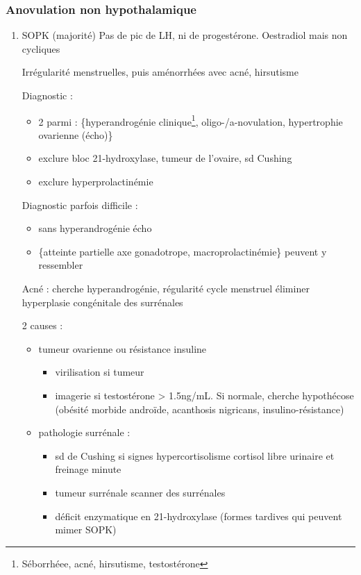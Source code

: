 \documentclass[11pt]{article}
\begin{document}
\subsubsection{Anovulation non hypothalamique}
\label{sec:org2eda7ab}
\begin{enumerate}
\item SOPK (majorité)
\label{sec:orgff34c23}
Pas de pic de LH, ni de progestérone. Oestradiol mais non cycliques

Irrégularité menstruelles, puis aménorrhées avec acné, hirsutisme

Diagnostic :
\begin{itemize}
\item 2 parmi : \{hyperandrogénie clinique\footnote{Séborrhéee, acné, hirsutisme, \inc testostérone}, oligo-/a-novulation, hypertrophie
ovarienne (écho)\}
\item exclure bloc 21-hydroxylase, tumeur de l'ovaire, sd Cushing
\item exclure hyperprolactinémie
\end{itemize}

Diagnostic parfois difficile :
\begin{itemize}
\item sans hyperandrogénie \thus écho
\item \{atteinte partielle axe gonadotrope, macroprolactinémie\} peuvent y ressembler
\end{itemize}

Acné : cherche hyperandrogénie, régularité cycle menstruel \thus éliminer
hyperplasie congénitale des surrénales

2 causes :
\begin{itemize}
\item tumeur ovarienne ou résistance insuline
\begin{itemize}
\item virilisation si tumeur
\item imagerie si testostérone > 1.5ng/mL. Si normale, cherche hypothécose
(obésité morbide androïde, acanthosis nigricans, insulino-résistance)
\end{itemize}
\item pathologie surrénale :
\begin{itemize}
\item sd de Cushing si signes hypercortisolisme \thus cortisol libre urinaire et
freinage minute
\item tumeur surrénale \thus scanner des surrénales
\item déficit enzymatique en 21-hydroxylase (\danger formes tardives qui peuvent
mimer SOPK)
\end{itemize}
\end{itemize}
\end{enumerate}
\end{document}
